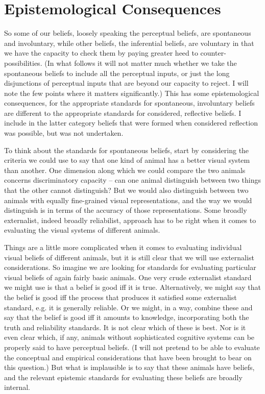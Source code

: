 \section{Epistemological Consequences} 

So some of our beliefs, loosely speaking the perceptual beliefs, are spontaneous and involuntary, while other beliefs, the inferential beliefs, are voluntary in that we have the capacity to check them by paying greater heed to counter-possibilities. (In what follows it will not matter much whether we take the spontaneous beliefs to include all the perceptual inputs, or just the long disjunctions of perceptual inputs that are beyond our capacity to reject. I will note the few points where it matters significantly.) This has some epistemological consequences, for the appropriate standards for spontaneous, involuntary beliefs are different to the appropriate standards for considered, reflective beliefs. I include in the latter category beliefs that were formed when considered reflection was possible, but was not undertaken.

To think about the standards for spontaneous beliefs, start by considering the criteria we could use to say that one kind of animal has a better visual system than another. One dimension along which we could compare the two animals concerns discriminatory capacity -- can one animal distinguish between two things that the other cannot distinguish? But we would also distinguish between two animals with equally fine-grained visual representations, and the way we would distinguish is in terms of the accuracy of those representations. Some broadly externalist, indeed broadly reliabilist, approach has to be right when it comes to evaluating the visual systems of different animals.

Things are a little more complicated when it comes to evaluating individual visual beliefs of different animals, but it is still clear that we will use externalist considerations. So imagine we are looking for standards for evaluating particular visual beliefs of again fairly basic animals. One very crude externalist standard we might use is that a belief is good iff it is true. Alternatively, we might say that the belief is good iff the process that produces it satisfied some externalist standard, e.g. it is generally reliable. Or we might, in a way, combine these and say that the belief is good iff it amounts to knowledge, incorporating both the truth and reliability standards. It is not clear which of these is best. Nor is it even clear which, if any, animals without sophisticated cognitive systems can be properly said to have perceptual beliefs. (I will not pretend to be able to evaluate the conceptual and empirical considerations that have been brought to bear on this question.) But what is implausible is to say that these animals have beliefs, and the relevant epistemic standards for evaluating these beliefs are broadly internal.

